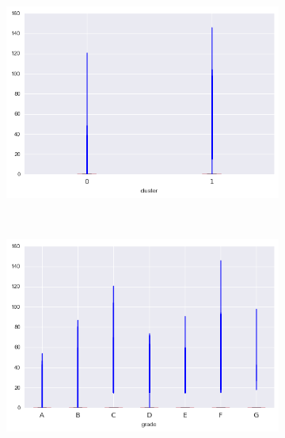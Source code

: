 \begin{apendicesenv}
\begin{figure}[t!]
\begin{subfigure}[t]{0.5\textwidth}
			\centerline{\includegraphics[width=1\textwidth]{img/total_rec_late_fee_by_cluster}}
    	\end{subfigure}%
    	~ 
    	\begin{subfigure}[t]{0.5\textwidth}
    		\centering
   
			\centerline{\includegraphics[width=1\textwidth]{img/total_rec_late_fee_by_grade}}

    	\end{subfigure}
    	    	\\
    	        \caption{dti}
    	\begin{subfigure}[t]{0.5\textwidth}
    		\centering


\end{subfigure}
\end{figure}
\end{apendicesenv}
